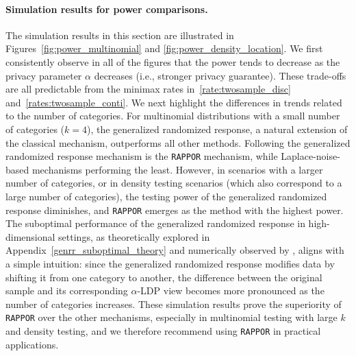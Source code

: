 \documentclass[twoside,11pt]{article}
\newcommand{\alphabetSize}{k} %
\newcommand{\privacyParameter}{\alpha} %
\begin{document}
\paragraph{Simulation results for power comparisons.}
The simulation results in this section are illustrated in Figures~\ref{fig:power_multinomial} and \ref{fig:power_density_location}. We first consistently observe in all of 
the figures that the power tends to decrease as the privacy parameter $\privacyParameter$ decreases (i.e., stronger privacy guarantee).
These trade-offs are all predictable from the minimax rates in~\eqref{rate:twosample_disc} and~\eqref{rates:twosample_conti}.
We next highlight the differences in trends related to the number of categories. For multinomial distributions with a small number of categories (\(\alphabetSize=4\)), the generalized randomized response, a natural extension of the classical mechanism, outperforms all other methods. Following the generalized randomized response mechanism is the \texttt{RAPPOR} mechanism, while Laplace-noise-based mechanisms performing the least. However, in scenarios with a larger number of categories, or in density testing scenarios (which also correspond to a large number of categories), the testing power of the generalized randomized response diminishes, and \texttt{RAPPOR} emerges as the method with the highest power. The suboptimal performance of the generalized randomized response in high-dimensional settings, as theoretically explored in Appendix~\ref{genrr_suboptimal_theory} and numerically observed by \citet{Gaboardi2018LDPChisq}, aligns with a simple intuition: since the generalized randomized response modifies data by shifting it from one category to another, the difference between the original sample and its corresponding $\privacyParameter$-LDP view becomes more pronounced as the number of categories increases. These simulation results prove the superiority of \texttt{RAPPOR} over the other mechanisms, especially in multinomial testing with large $k$ and density testing, and we therefore recommend using \texttt{RAPPOR} in practical applications. 
\end{document}
